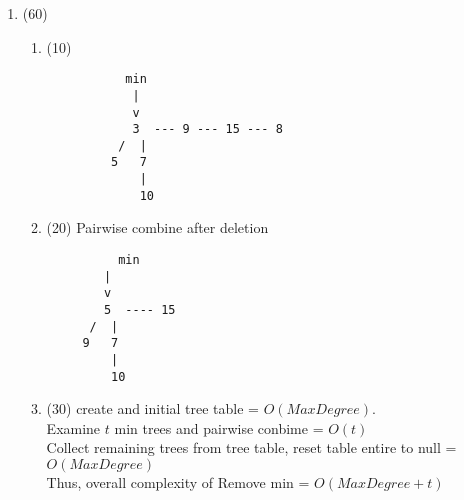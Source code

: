 \begin{enumerate}
\item (60)
 \begin{enumerate}
 \item (10) 
  \begin{verbatim}
           min
            |
            v
            3  --- 9 --- 15 --- 8
          /  |
         5   7
             |
             10
  \end{verbatim}
 \item (20) Pairwise combine after deletion 
  \begin{verbatim}
          min
        |
        v
        5  ---- 15
      /  |      
     9   7    
         |
         10
  \end{verbatim}
  \item (30)
    create and initial tree table = $O(MaxDegree)$. \\
    Examine $t$ min trees and pairwise conbime = $O(t)$ \\
    Collect remaining trees from tree table, reset table entire to null  = $O(MaxDegree)$ \\
    Thus, overall complexity of Remove min = $O(MaxDegree + t)$

 \end{enumerate}

\end{enumerate}




